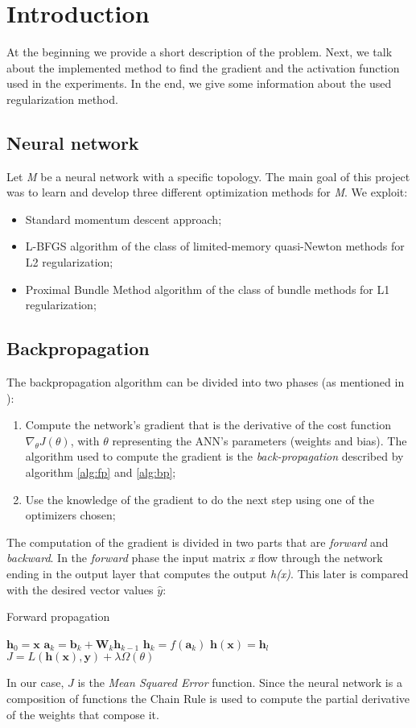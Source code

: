 \section{Introduction}
At the beginning we provide a short description of the problem. Next, we talk about the implemented method to find the gradient and the activation function used in the experiments. In the end, we give some information about the used regularization method.
\subsection{Neural network}
Let \textit{M} be a neural network with a specific topology. The main goal of this project was to learn and develop three different optimization methods for \textit{M}. We exploit:
\begin{itemize}
	\item Standard momentum descent approach;
	\item L-BFGS algorithm of the class of limited-memory quasi-Newton methods for L2 regularization;
	\item Proximal Bundle Method algorithm of the class of bundle methods for L1 regularization;
\end{itemize}
\subsection{Backpropagation}
The backpropagation algorithm can be divided into two phases (as mentioned in \cite{backpropagation}):
\begin{enumerate}
	\item Compute the network's gradient that is the derivative of the cost function
	$\nabla_{\theta} J(\theta)$, with $\theta$ representing the ANN's parameters (weights and bias). The algorithm used to compute the gradient is the \textit{back-propagation} described by
	algorithm \ref{alg:fp} and \ref{alg:bp};
	\item Use the knowledge of the gradient to do the next step using one of the optimizers chosen;
\end{enumerate}
The computation of the gradient is divided in two parts that are \textit{forward} and \textit{backward}. In the \textit{forward} phase the input matrix \textit{x} flow through the network ending in the output layer that computes the output \textit{h(x)}. This later is compared with the desired vector values $\widehat{y}$:
\begin{algorithm}[H]
	\caption{Forward propagation}
	\label{alg:fp}
	\begin{algorithmic}[1]
		\State $\mathbf{h}_{0} = \mathbf{x}$
		\State $\mathbf{a}_{k} = \mathbf{b}_{k} + \mathbf{W}_{k}\mathbf{h}_{k - 1}$
		\State $\mathbf{h}_{k} = f(\mathbf{a}_{k})$
		\EndFor
		\State $\mathbf{h(x)} = \mathbf{h}_{l}$
		\State $J = L(\mathbf{h(x)}, \mathbf{y}) + \lambda \Omega(\theta)$
		\EndProcedure
	\end{algorithmic}
\end{algorithm}
In our case, $J$ is the \textit{Mean Squared Error} function. Since the neural network is a composition of functions the Chain Rule is used to compute the partial derivative of the weights that compose it. 

